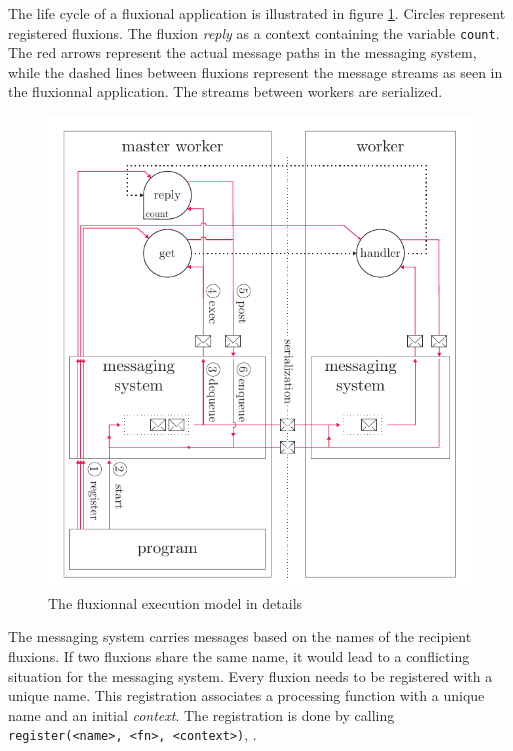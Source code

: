 The life cycle of a fluxional application is illustrated in figure \ref{fig:MesSys}.
Circles represent registered fluxions.
The fluxion \textit{reply} as a context containing the variable \texttt{count}.
The red arrows represent the actual message paths in the messaging system, while the dashed lines between fluxions represent the message streams as seen in the fluxionnal application.
The streams between workers are serialized.

\begin{figure}[h!]
  \includegraphics[width=\linewidth]{ressources/schema-message.pdf}
  \caption{The fluxionnal execution model in details}
  \label{fig:MesSys}
\end{figure}

The messaging system carries messages based on the names of the recipient fluxions.
If two fluxions share the same name, it would lead to a conflicting situation for the messaging system.
Every fluxion needs to be registered with a unique name.
This registration associates a processing function with a unique name and an initial \textit{context}.
The registration is done by calling \texttt{register(<name>, <fn>, <context>)}, .

